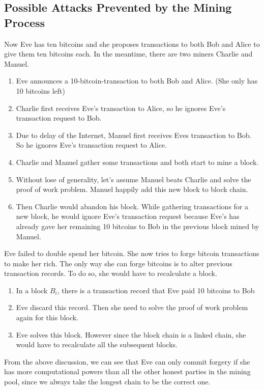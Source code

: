 \documentclass[12pt,a4paper]{article}
\begin{document}
\subsection{Possible Attacks Prevented by the Mining Process} 
Now Eve has ten bitcoins and she proposes transactions to both Bob and Alice to give them ten bitcoins each. In the meantime, there are two miners Charlie and Manuel.
\begin{enumerate}
	\item Eve announces a 10-bitcoin-transaction to  both Bob and Alice. (She only has 10 bitcoins left)
	\item Charlie first receives Eve's transaction to Alice, so he ignores Eve's transaction request to Bob.
	\item Due to delay of the Internet, Manuel first receives Eves transaction to Bob. So he ignores Eve's transaction request to Alice.
	\item Charlie and Manuel gather some transactions and both start to mine a block. 
	\item Without lose of generality, let's assume Manuel beats Charlie and solve the proof of work problem. Manuel happily add this new block to block chain. 
	\item Then Charlie would abandon his block. While gathering transactions for a new block, he would ignore Eve's transaction request because Eve's has already gave her remaining 10 bitcoins to Bob in the previous block mined by Manuel. 
\end{enumerate}

Eve failed to double spend her bitcoin. She now tries to forge bitcoin transactions to make her rich. The only way she can forge bitcoins is to alter previous transaction records. To do so, she would have to recalculate a block.
\begin{enumerate}
	\item In a block $B_i$, there is a transaction record that Eve paid 10 bitcoins to Bob
	\item Eve discard this record. Then she need to solve the proof of work problem again for this block.
	\item Eve solves this block. However since the block chain is a linked chain, she would have to recalculate all the subsequent blocks. 
\end{enumerate}
From the above discussion, we can see that Eve can only commit forgery if she has more computational powers than all the other honest parties in the mining pool, since we always take the longest chain to be the correct one.
\end{document}
